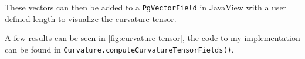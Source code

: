 \documentclass[a4paper,10pt,notitlepage]{scrreprt}
\begin{document}
These vectors can then be added to a \texttt{PgVectorField} in JavaView with a
user defined length to visualize the curvature tensor.

A few results can be seen in \ref{fig:curvature-tensor}, the code to my
implementation can be found in
\texttt{Curvature.computeCurvatureTensorFields()}.

\begin{figure}

\end{figure}
\end{document}

